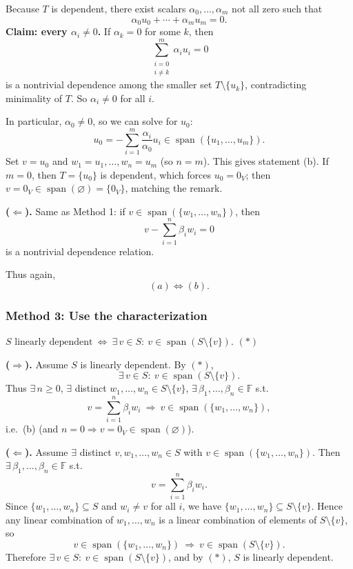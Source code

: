 \documentclass[12pt]{article}
\newcommand{\F}{\mathbb{F}}
\newcommand{\Span}{\operatorname{span}}
\begin{document}
Because \(T\) is dependent, there exist scalars \(\alpha_0,\ldots,\alpha_m\) not all zero such that
\[
\alpha_0 u_0+\cdots+\alpha_m u_m=0.
\]
\textbf{Claim: every \(\alpha_i\neq 0\).}
If \(\alpha_k=0\) for some \(k\), then
\[
\sum_{\substack{i=0\\ i\neq k}}^{m} \alpha_i u_i=0
\]
is a nontrivial dependence among the smaller set \(T\setminus\{u_k\}\), contradicting minimality of \(T\).
So \(\alpha_i\neq 0\) for all \(i\).

In particular, \(\alpha_0\neq 0\), so we can solve for \(u_0\):
\[
u_0 = -\sum_{i=1}^{m}\frac{\alpha_i}{\alpha_0}u_i \in \Span(\{u_1,\ldots,u_m\}).
\]
Set \(v=u_0\) and \(w_1=u_1,\ldots,w_n=u_m\) (so \(n=m\)).
This gives statement (b).
If \(m=0\), then \(T=\{u_0\}\) is dependent, which forces \(u_0=0_V\); then \(v=0_V\in \Span(\varnothing)=\{0_V\}\), matching the remark.

\textbf{(\(\Leftarrow\)).}
Same as Method 1: if \(v\in\Span(\{w_1,\ldots,w_n\})\), then
\[
v-\sum_{i=1}^{n}\beta_i w_i=0
\]
is a nontrivial dependence relation.

Thus again,
\[
\boxed{\ (a)\Longleftrightarrow (b).\ }
\]

\subsubsection{Method 3: Use the characterization}

\(S \text{ linearly dependent}\ \Longleftrightarrow\ \exists\,v\in S:\ v\in \Span(S\setminus\{v\}).\)
\hfill $(*)$
\medskip

\textbf{(\(\Rightarrow\)).}
Assume \(S\) is linearly dependent. By \((*)\),
\[
\exists\,v\in S:\ v\in \Span(S\setminus\{v\}).
\]
Thus \(\exists\,n\ge 0\), \(\exists\) distinct \(w_1,\ldots,w_n\in S\setminus\{v\}\), \(\exists\,\beta_1,\ldots,\beta_n\in\F\) s.t.
\[
v=\sum_{i=1}^n \beta_i w_i \ \Longrightarrow\ v\in \Span(\{w_1,\ldots,w_n\}),
\]
i.e.\ (b) (and \(n=0\Rightarrow v=0_V\in\Span(\varnothing)\)).

\textbf{(\(\Leftarrow\)).}
Assume \(\exists\) distinct \(v,w_1,\ldots,w_n\in S\) with \(v\in \Span(\{w_1,\ldots,w_n\})\).
Then \(\exists\,\beta_1,\ldots,\beta_n\in\F\) s.t.
\[
v=\sum_{i=1}^n \beta_i w_i.
\]
Since \(\{w_1,\ldots,w_n\}\subseteq S\) and \(w_i\neq v\) for all \(i\), we have \(\{w_1,\ldots,w_n\}\subseteq S\setminus\{v\}\).
Hence any linear combination of \(w_1,\ldots,w_n\) is a linear combination of elements of \(S\setminus\{v\}\), so
\[
v\in \Span(\{w_1,\ldots,w_n\}) \ \Longrightarrow\ v\in \Span(S\setminus\{v\}).
\]
Therefore \(\exists\,v\in S:\ v\in \Span(S\setminus\{v\})\), and by \((*)\), \(S\) is linearly dependent.
\end{document}
